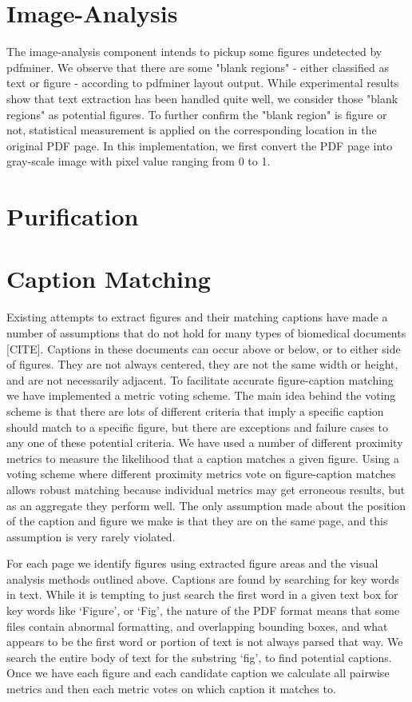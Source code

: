\documentclass{article}
\begin{document}
\section{Image-Analysis}
The image-analysis component intends to pickup some figures undetected by pdfminer. We observe that there are some "blank regions" - either classified as text or figure - according to pdfminer layout output. While experimental results show that text extraction has been handled quite well, we consider those "blank regions" as potential figures. To further confirm the "blank region" is figure or not, statistical measurement is applied on the corresponding location in the original PDF page.
In this implementation, we first convert the PDF page into gray-scale image with pixel value ranging from 0 to 1.  


\section{Purification}



\section{Caption Matching}
\label{sec:CaptionMatching}
Existing attempts to extract figures and their matching captions have made a number of assumptions that do not hold for many types of biomedical documents [CITE]. Captions in these documents can occur above or below, or  to either side of figures. They are not always centered, they are not the same width or height, and are not necessarily adjacent. To facilitate accurate figure-caption matching we have implemented a metric voting scheme. The main idea behind the voting scheme is that there are lots of different criteria that imply a specific caption should match to a specific figure, but there are exceptions and failure cases to any one of these potential criteria. We have used a number of different proximity metrics to measure the likelihood that a  caption matches a given figure. Using a voting scheme where different proximity metrics vote on figure-caption matches allows robust matching because individual metrics may get erroneous results, but as an aggregate they perform well. The only assumption made about the position of the caption and figure we make is that they are on the same page, and this assumption is very rarely violated.

For each page we identify figures using extracted figure areas and the visual analysis methods outlined above. Captions are found by searching for key words in text. While it is tempting to just search the first word in a given text box for key words like `Figure', or `Fig', the nature of the PDF format means that some files contain abnormal formatting, and overlapping bounding boxes, and what appears to be the first word or portion of text is not always parsed that way. We search the entire body of text for the substring `fig', to find potential captions. Once we have each figure and each candidate caption we calculate all pairwise metrics and then each metric votes on which caption it matches to.
\end{document}

